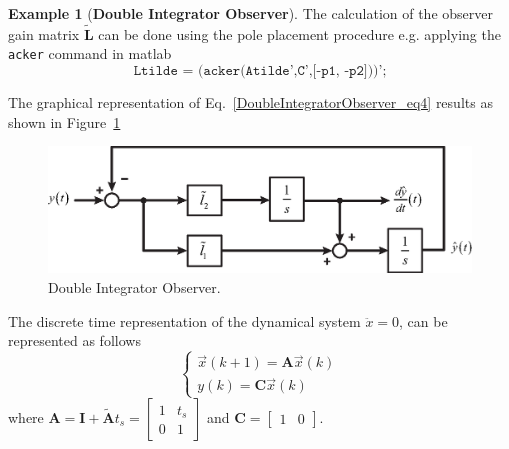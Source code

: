 \documentclass[11pt,a4paper,oneside]{book}
\numberwithin{equation}{section}
\theoremstyle{it}
\theoremstyle{definition}
\newtheorem{example}{Example}[chapter]
\begin{document}
\begin{example}[\textbf{Double Integrator Observer}]
The calculation of the observer gain matrix $\tilde{\mathbf{L}}$ can be done 
using the 
pole placement procedure e.g. applying the \texttt{acker} command in matlab
\begin{equation}\label{DoubleIntegratorObserver_eq5}
	\texttt{Ltilde = (acker(Atilde',C',[-p1, -p2]))';}
\end{equation}

The graphical representation of Eq.~\eqref{DoubleIntegratorObserver_eq4} 
results as shown in Figure~\ref{DoubleIntegratorObserver_ct_splitted}
\begin{figure}[H]
	\centering
	\includegraphics[width = 320pt,	keepaspectratio] 
	{figures/double_integrator_observer.eps}
	\captionsetup{width=0.5\textwidth, font=small}		
	\caption{Double Integrator Observer.}
	\label{DoubleIntegratorObserver_ct_splitted}
\end{figure}

The discrete time representation of the dynamical system $\ddot{x}=0$, can be 
represented as follows
\begin{equation}\label{DoubleIntegratorObserver_eq6}
	\left\lbrace \begin{aligned}
		{\vec{x}}(k+1)=\mathbf{A}\vec{x}(k) \\
		y(k)=\mathbf{C}\vec{x}(k)
	\end{aligned}\right. 
\end{equation}
where $\mathbf{A}=\mathbf{I}+\tilde{\mathbf{A}}t_s=\begin{bmatrix} 1&t_s\\0&1 
\end{bmatrix}$ and 
$\mathbf{C}=\begin{bmatrix} 1&0 \end{bmatrix}$.


\end{example}
\end{document}
